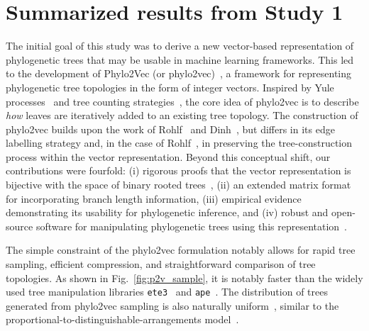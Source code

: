 \section{Summarized results from Study 1}
The initial goal of this study was to derive a new vector-based representation of phylogenetic trees that may be usable in machine learning frameworks. This led to the development of Phylo2Vec (or phylo2vec)~\cite{penn2025, scheidwasser2025}, a framework for representing phylogenetic tree topologies in the form of integer vectors. Inspired by Yule processes~\cite{steel2001} and tree counting strategies~\cite{knuth1973, rotem1978, proskurowski1980, rohlf1983}, the core idea of phylo2vec is to describe \emph{how} leaves are iteratively added to an existing tree topology. The construction of phylo2vec builds upon the work of Rohlf~\cite{rohlf1983} and Dinh~\cite{dinh2010}, but differs in its edge labelling strategy and, in the case of Rohlf~\cite{rohlf1983}, in preserving the tree-construction process within the vector representation. Beyond this conceptual shift, our contributions were fourfold: (i) rigorous proofs that the vector representation is bijective with the space of binary rooted trees~\cite{penn2025}, (ii) an extended matrix format for incorporating branch length information, (iii) empirical evidence demonstrating its usability for phylogenetic inference, and (iv) robust and open-source software for manipulating phylogenetic trees using this representation~\cite{scheidwasser2025}. %


The simple constraint of the phylo2vec formulation notably allows for rapid tree sampling, efficient compression, and straightforward comparison of tree topologies. As shown in Fig.~\ref{fig:p2v_sample}, it is notably faster than the widely used tree manipulation libraries \texttt{ete3}~\cite{huerta2016} and \texttt{ape}~\cite{paradis2019}. The distribution of trees generated from phylo2vec sampling is also naturally uniform~\cite{scheidwasser2025c}, similar to the proportional-to-distinguishable-arrangements model~\cite{holman2005}.

